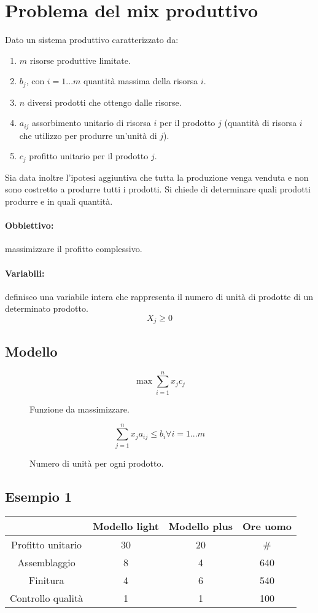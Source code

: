 \documentclass[\main/main.tex]{subfiles}
\begin{document}
\section{Problema del mix produttivo}
Dato un sistema produttivo caratterizzato da:

\begin{enumerate}
\item $m$ risorse produttive limitate.
\item $b_j$, con $i=1...m$ quantità massima della risorsa $i$. 
\item $n$ diversi prodotti che ottengo dalle risorse.
\item $a_{ij}$ assorbimento unitario di risorsa $i$ per il prodotto $j$ (quantità di risorsa $i$ che utilizzo per produrre un'unità di $j$).
\item $c_j$ profitto unitario per il prodotto $j$.
\end{enumerate}

Sia data inoltre l'ipotesi aggiuntiva che tutta la produzione venga venduta e non sono costretto a produrre tutti i prodotti.
Si chiede di determinare quali prodotti produrre e in quali quantità.

\paragraph{Obbiettivo:} massimizzare il profitto complessivo.
\paragraph{Variabili: } definisco una variabile intera che rappresenta il numero di unità di prodotte di un determinato prodotto.
\[
	X_{j} \geq 0
\]

\subsection{Modello}
\begin{figure}[H]
 \centering
 \begin{minipage}{0.5\textwidth}
 \centering
 \[
	\max \sum_{i=1}^n x_jc_j
 \]
\caption{Funzione da massimizzare.}
 \end{minipage}\hfill
 \begin{minipage}{0.5\textwidth}
 \[
	\sum_{j=1}^n x_j a_{ij} \leq b_i \forall i = 1...m
 \]
\caption{Numero di unità per ogni prodotto.}
 \end{minipage}\hfill
\end{figure}

\subsection{Esempio 1}

\begin{center}
\begin{tabular}{c|c|c|c}
& Modello light & Modello plus & Ore uomo \\
\hline
Profitto unitario & 30 & 20 & \# \\
\hline
Assemblaggio & 8 & 4 & 640 \\ 
\hline
Finitura & 4 & 6 & 540 \\
\hline
Controllo qualità & 1 & 1 & 100
\end{tabular}
\end{center}
\end{document}
